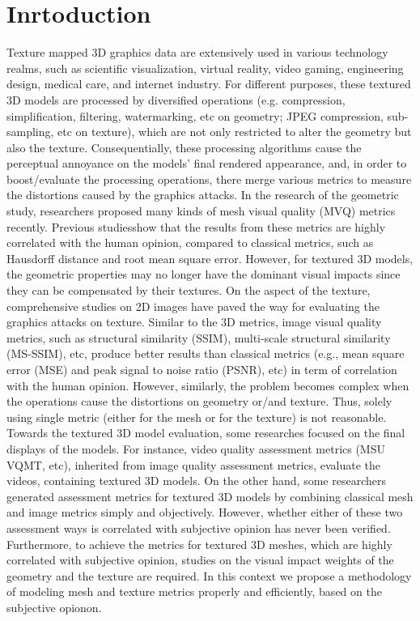 \section{Inrtoduction}
Texture mapped 3D graphics data are extensively used in various technology realms, such as scientific visualization, virtual reality, video gaming, engineering design, medical care, and internet industry. For different purposes, these textured 3D models are processed by diversified operations (e.g. compression, simplification, filtering, watermarking, etc on geometry; JPEG compression, sub-sampling, etc on texture), which are not only restricted to alter the geometry but also the texture. Consequentially, these processing algorithms cause the perceptual annoyance on the models’ final rendered appearance, and, in order to boost/evaluate the processing operations, there merge various metrics to measure the distortions caused by the graphics attacks. In the research of the geometric study, researchers\cite{Lavou__2011}\cite{V_a_2012}\cite{Wang_2011} proposed many kinds of mesh visual quality (MVQ) metrics recently. Previous studies\cite{Corsini_2013}\cite{Guo_2015}show that the results from these metrics are highly correlated with the human opinion, compared to classical metrics, such as Hausdorff distance and root mean square error. However, for textured 3D models, the geometric properties may no longer have the dominant visual impacts since they can be compensated by their textures.  On the aspect of the texture, comprehensive studies on 2D images have paved the way for evaluating the graphics attacks on texture.  Similar to the 3D metrics, image visual quality metrics, such as structural similarity (SSIM)\cite{Wang_2004}, multi-scale structural similarity (MS-SSIM)\cite{Zhou_Wang_2011}, etc, produce better results than classical metrics (e.g., mean square error (MSE) and peak signal to noise ratio (PSNR), etc) in term of correlation with the human opinion. However, similarly, the problem becomes complex when the operations cause the distortions on geometry or/and texture. Thus, solely using single metric (either for the mesh or for the texture) is not reasonable. Towards the textured 3D model evaluation, some researches focused on the final displays of the models. For instance, video quality assessment metrics (MSU VQMT, etc), inherited from image quality assessment metrics\cite{Wang_2006}, evaluate the videos, containing textured 3D models.  On the other hand, some researchers\cite{Tian_2004} generated assessment metrics for textured 3D models by combining classical mesh and image metrics simply and objectively. However, whether either of these two assessment ways is correlated with subjective opinion has never been verified. Furthermore, to achieve the metrics for textured 3D meshes, which are highly correlated with subjective opinion, studies on the visual impact weights of the geometry and the texture are required.
In this context we propose a methodology of modeling mesh and texture metrics properly and efficiently, based on the subjective opionon.